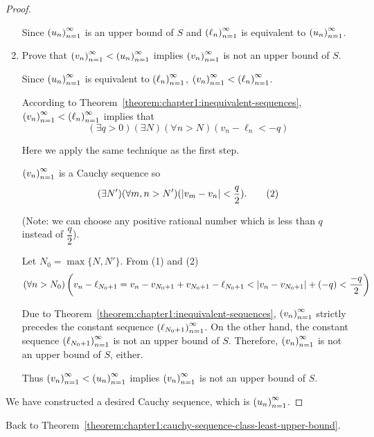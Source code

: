 \begin{proof}
\begin{enumerate}[label={\textbf{Step \arabic*.}},itemindent=0.5cm]
              Since ${\left({u_{n}}\right)}^{\infty}_{n=1}$ is an upper bound of $S$ and ${\left({\ell_{n}}\right)}^{\infty}_{n=1}$ is equivalent to ${\left({u_{n}}\right)}^{\infty}_{n=1}$.
        \item Prove that ${\left({v_{n}}\right)}^{\infty}_{n=1} < {\left({u_{n}}\right)}^{\infty}_{n=1}$ implies ${\left({v_{n}}\right)}^{\infty}_{n=1}$ is not an upper bound of $S$.

              Since ${\left({u_{n}}\right)}^{\infty}_{n=1}$ is equivalent to ${\left({\ell_{n}}\right)}^{\infty}_{n=1}$, ${\left({v_{n}}\right)}^{\infty}_{n=1} < {\left({\ell_{n}}\right)}^{\infty}_{n=1}$.

              According to Theorem~\ref{theorem:chapter1:inequivalent-sequences}, ${\left({v_{n}}\right)}^{\infty}_{n=1} < {\left({\ell_{n}}\right)}^{\infty}_{n=1}$ implies that
              \begin{equation*}
                  (\exists q > 0)(\exists N)(\forall n > N)(v_{n} - \ell_{n} < -q)
                  \tag{1}
              \end{equation*}

              Here we apply the same technique as the first step.

              ${\left({v_{n}}\right)}^{\infty}_{n=1}$ is a Cauchy sequence so
              \begin{equation*}
                  (\exists N')(\forall m, n > N')(\left\vert{v_{m} - v_{n}}\right\vert < \frac{q}{2}).
                  \tag{2}
              \end{equation*}

              (Note: we can choose any positive rational number which is less than $q$ instead of $\dfrac{q}{2}$).

              Let $N_{0} = \max\{ N, N' \}$. From (1) and (2)
              \[
                  (\forall n > N_{0})\left(v_{n} - \ell_{N_{0}+1} = v_{n} - v_{N_{0} + 1} + v_{N_{0} + 1} - \ell_{N_{0} + 1} < \left\vert{v_{n} - v_{N_{0} + 1}}\right\vert + (-q) < \frac{-q}{2}\right)
              \]

              Due to Theorem~\ref{theorem:chapter1:inequivalent-sequences}, ${\left({v_{n}}\right)}^{\infty}_{n=1}$ strictly precedes the constant sequence ${\left({\ell_{N_{0} + 1}}\right)}^{\infty}_{n=1}$. On the other hand, the constant sequence ${\left({\ell_{N_{0} + 1}}\right)}^{\infty}_{n=1}$ is not an upper bound of $S$. Therefore, ${\left({v_{n}}\right)}^{\infty}_{n=1}$ is not an upper bound of $S$, either.

              Thus ${\left({v_{n}}\right)}^{\infty}_{n=1} < {\left({u_{n}}\right)}^{\infty}_{n=1}$ implies ${\left({v_{n}}\right)}^{\infty}_{n=1}$ is not an upper bound of $S$.
    \end{enumerate}

    We have constructed a desired Cauchy sequence, which is ${\left({u_{n}}\right)}^{\infty}_{n=1}$.
\end{proof}

Back to Theorem~\ref{theorem:chapter1:cauchy-sequence-class-least-upper-bound}.

